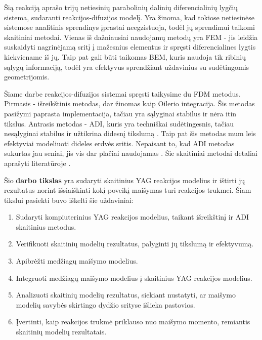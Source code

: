 Šią reakciją aprašo trijų netiesinių parabolinių dalinių diferencialinių lygčių sistema, sudaranti reakcijos-difuzijos modelį. Yra žinoma, kad tokiose netiesinėse sistemose analitinis sprendinys įprastai neegzistuoja, todėl jų sprendimui taikomi skaitiniai metodai. Vienas iš dažniausiai naudojamų metodų yra FEM - jis leidžia suskaidyti nagrinėjamą sritį į mažesnius elementus ir spręsti diferencialines lygtis kiekviename iš jų. Taip pat gali būti taikomas BEM, kuris naudoja tik ribinių sąlygų informaciją, todėl yra efektyvus sprendžiant uždavinius su sudėtingomis geometrijomis.

Šiame darbe reakcijos-difuzijos sistemai spręsti taikysime du FDM metodus. Pirmasis - išreikštinis metodas, dar žinomas kaip Oilerio integracija. Šis metodas pasižymi paprasta implementacija, tačiau yra sąlyginai stabilus ir nėra itin tikslus. Antrasis metodas - ADI, kuris yra techniškai sudėtingesnis, tačiau nesąlyginai stabilus ir užtikrina didesnį tikslumą \cite{doi:10.1137/0103003}. Taip pat šis metodas mum leis efektyviai modeliuoti dideles erdvės sritis. Nepaisant to, kad ADI metodas sukurtas jau seniai, jis vis dar plačiai naudojamas \cite{gaidamauskaiteComparisonFiniteDifference2007}. Šie skaitiniai metodai detaliai aprašyti literatūroje \cite{pressNumericalRecipes3rd2007,levequeFiniteDifferenceMethods2007}.

Šio \textbf{darbo tikslas} yra sudaryti skaitinius YAG reakcijos modelius ir ištirti jų rezultatus norint išsiaiškinti kokį poveikį maišymas turi reakcijos trukmei. Šiam tikslui pasiekti buvo iškelti šie uždaviniai:

\begin{enumerate}
  \item Sudaryti kompiuterinius YAG reakcijos modelius, taikant išreikštinį ir ADI skaitinius metodus.
  \item Verifikuoti skaitinių modelių rezultatus, palyginti jų tikslumą ir efektyvumą.
  \item Apibrėžti medžiagų maišymo modelius.
  \item Integruoti medžiagų maišymo modelius į skaitinius YAG reakcijos modelius.
  \item Analizuoti skaitinių modelių rezultatus, siekiant nustatyti, ar maišymo modelių savybės skirtingo dydžio srityse išlieka pastovios.
  \item Įvertinti, kaip reakcijos trukmė priklauso nuo maišymo momento, remiantis skaitinių modelių rezultatais.
\end{enumerate}